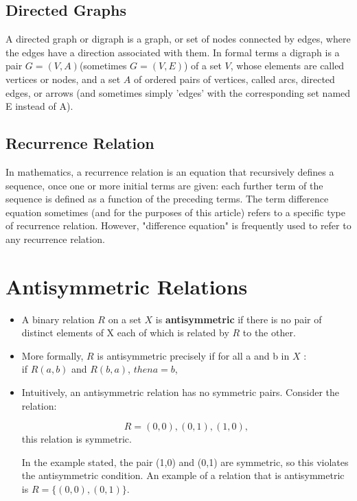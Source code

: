 \documentclass[]{report}
\begin{document}
\newpage
\subsection{Directed Graphs}
A directed graph or digraph is a graph, or set of nodes connected by edges, where the edges have a direction associated with them. In formal terms a digraph is a pair $G=(V,A)$(sometimes $G=(V,E)$) of a set $V$, whose elements are called vertices or nodes, and a set $A$ of ordered pairs of vertices, called arcs, directed edges, or arrows (and sometimes simply 'edges' with the corresponding set named E instead of A).


\subsection{Recurrence Relation}
In mathematics, a recurrence relation is an equation that recursively defines a sequence, once one or more initial terms are given: each further term of the sequence is defined as a function of the preceding terms.
The term difference equation sometimes (and for the purposes of this article) refers to a specific type of recurrence relation. However, "difference equation" is frequently used to refer to any recurrence relation.




\section{Antisymmetric Relations}

\begin{itemize}
\item A binary relation $R$ on a set $X$ is \textbf{antisymmetric} if there is no pair of distinct elements of X each of which is related by $R$ to the other. 

\item More formally, $R$ is antisymmetric precisely if for all a and b in $X$ :\\
if $R(a,b)$ and $R(b,a)$, $then a = b$,

\item Intuitively, an antisymmetric relation has no symmetric pairs. Consider the relation: 

\[R = { (0,0) , (0,1) , (1,0) } ,\] this relation is symmetric. 

In the example stated, the pair (1,0) and (0,1) are symmetric, so this violates the antisymmetric condition. An example of a relation that is antisymmetric is $R=\{(0,0),(0,1)\}$.
\end{itemize}
\end{document}
